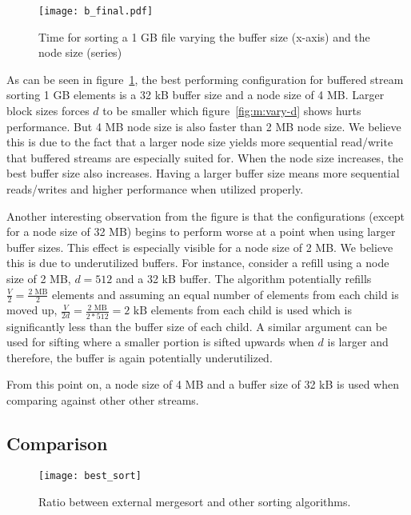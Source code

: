 \begin{figure}[h!]
  \centering
  \texttt{[image: b\_final.pdf]}
  \caption{Time for sorting a 1 GB file varying the buffer size (x-axis) and the node size (series)}
  \label{fig:b_final}
\end{figure}

As can be seen in figure~\ref{fig:b_final}, the best performing configuration for buffered stream sorting 1 GB elements is a 32 kB buffer size and a node size of 4 MB. Larger block sizes forces $d$ to be smaller which figure~\ref{fig:m:vary-d} shows hurts performance. But 4 MB node size is also faster than 2 MB node size. We believe this is due to the fact that a larger node size yields more sequential read/write that buffered streams are especially suited for. When the node size increases, the best buffer size also increases. Having a larger buffer size means more sequential reads/writes and higher performance when utilized properly.

Another interesting observation from the figure is that the configurations (except for a node size of 32 MB) begins to perform worse at a point when using larger buffer sizes. This effect is especially visible for a node size of 2 MB. We believe this is due to underutilized buffers. For instance, consider a refill using a node size of 2 MB, $d=512$ and a 32 kB buffer. The algorithm potentially refills $\frac{V}{2}=\frac{\textrm{2 MB}}{2}$ elements and assuming an equal number of elements from each child is moved up, $\frac{V}{2d}=\frac{\textrm{2 MB}}{2*512}=\textrm{2 kB}$ elements from each child is used which is significantly less than the buffer size of each child. A similar argument can be used for sifting where a smaller portion is sifted upwards when $d$ is larger and therefore, the buffer is again potentially underutilized.

From this point on, a node size of 4 MB and a buffer size of 32 kB is used when comparing against other other streams.

\subsection{Comparison}

\begin{figure}
  \centering
  \texttt{[image: best\_sort]}
  \caption{Ratio between external mergesort and other sorting algorithms.}
  \label{fig:best_sort}
\end{figure}

